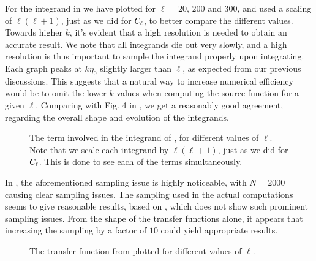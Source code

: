 For the integrand in  we have plotted for $\ell=20,\,200$ and $300$, and used a scaling of $\ell(\ell+1)$, just as we did for $C_\ell$, to better compare the different values. Towards higher $k$, it's evident that a high resolution is needed to obtain an accurate result. We note that all integrands die out very slowly, and a high resolution is thus important to sample the integrand properly upon integrating. Each graph peaks at $k\eta_0$ slightly larger than $\ell$, as expected from our previous discussions. This suggests that a natural way to increase numerical efficiency would be to omit the lower $k$-values when computing the source function for a given $\ell$. Comparing with Fig. 4 in \citeauthor{callin}, we get a reasonably good agreement, regarding the overall shape and evolution of the integrands.             
\begin{figure}[ht!]
    \caption{The term involved in the integrand of , for different values of $\ell$. Note that we scale each integrand by $\ell(\ell+1)$, just as we did for $C_\ell$. This is done to see each of the terms simultaneously.}
    \label{fig:M4:results:integrand_thetas}
\end{figure}

In , the aforementioned sampling issue is highly noticeable, with $N=2000$ causing clear sampling issues. The sampling used in the actual computations seems to give reasonable results, based on , which does not show such prominent sampling issues. From the shape of the transfer functions alone, it appears that increasing the sampling by a factor of $10$ could yield appropriate results. 

\begin{figure}[ht!]
    \caption{The transfer function from  plotted for different values of $\ell$.}
    \label{fig:M4:results:thetas}
\end{figure}